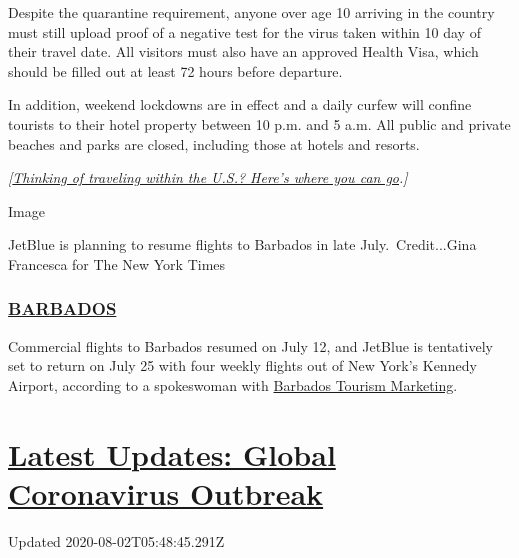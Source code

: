 Despite the quarantine requirement, anyone over age 10 arriving in the
country must still upload proof of a negative test for the virus taken
within 10 day of their travel date. All visitors must also have an
approved Health Visa, which should be filled out at least 72 hours
before departure.

In addition, weekend lockdowns are in effect and a daily curfew will
confine tourists to their hotel property between 10 p.m. and 5 a.m. All
public and private beaches and parks are closed, including those at
hotels and resorts.

\emph{{[}}\href{https://www.nytimes.com/2020/07/10/travel/state-travel-restrictions.html}{\emph{Thinking
of traveling within the U.S.? Here's where you can go}}\emph{.{]}}

Image

JetBlue is planning to resume flights to Barbados in late
July.~Credit...Gina Francesca for The New York Times

\hypertarget{barbados}{%
\subsubsection{\texorpdfstring{\href{https://gisbarbados.gov.bb/blog/commercial-air-traffic-resumes-july-12-with-protocols/}{BARBADOS}}{BARBADOS}}\label{barbados}}

Commercial flights to Barbados resumed on July 12, and JetBlue is
tentatively set to return on July 25 with four weekly flights out of New
York's Kennedy Airport, according to a spokeswoman with
\href{https://www.visitbarbados.org}{Barbados Tourism Marketing}.

\hypertarget{latest-updates-global-coronavirus-outbreak}{%
\section{\texorpdfstring{\href{https://www.nytimes.com/2020/08/01/world/coronavirus-covid-19.html?action=click\&pgtype=Article\&state=default\&region=MAIN_CONTENT_1\&context=storylines_live_updates}{Latest
Updates: Global Coronavirus
Outbreak}}{Latest Updates: Global Coronavirus Outbreak}}\label{latest-updates-global-coronavirus-outbreak}}

Updated 2020-08-02T05:48:45.291Z

